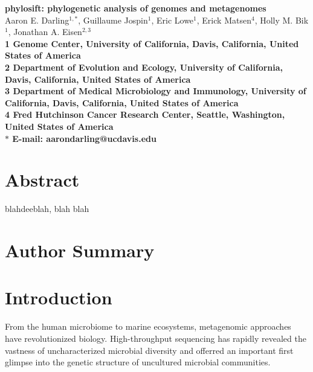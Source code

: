 \documentclass[10pt]{article}
\date{}
\begin{document}
\begin{flushleft}
{\Large
\textbf{phylosift: phylogenetic analysis of genomes and metagenomes}
}
\\
Aaron E. Darling$^{1,\ast}$,
Guillaume Jospin$^{1}$, 
Eric Lowe$^{1}$, 
Erick Matsen$^{4}$, 
Holly M. Bik$^{1}$,
Jonathan A. Eisen$^{2,3}$
\\
\bf{1} Genome Center, University of California, Davis, California, United States of America
\\
\bf{2} Department of Evolution and Ecology, University of California, Davis, California, United States of America
\\
\bf{3} Department of Medical Microbiology and Immunology, University of California, Davis, California, United States of America
\\
\bf{4} Fred Hutchinson Cancer Research Center, Seattle, Washington, United States of America
\\
$\ast$ E-mail: aarondarling@ucdavis.edu
\end{flushleft}

\section*{Abstract}
blahdeeblah, blah blah
\section*{Author Summary}

\section*{Introduction}

From the human microbiome to marine ecosystems, metagenomic approaches have revolutionized biology. High-throughput sequencing has rapidly revealed the vastness of uncharacterized microbial diversity and offerred an important first glimpse into the genetic structure of uncultured microbial communities.
\end{document}
